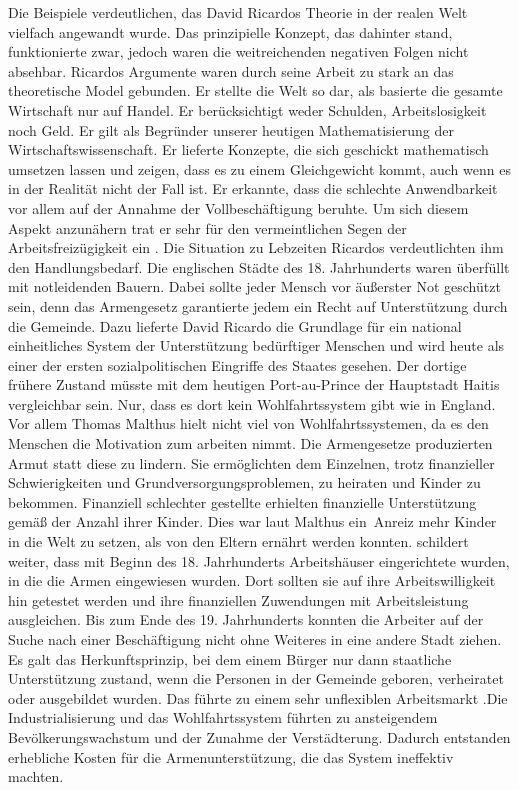 Die Beispiele verdeutlichen, das David Ricardos Theorie in der realen Welt vielfach angewandt wurde. Das prinzipielle Konzept, das dahinter stand, funktionierte zwar, jedoch waren die weitreichenden negativen Folgen nicht absehbar. Ricardos Argumente waren durch seine Arbeit zu stark an das theoretische Model gebunden. Er stellte die Welt so dar, als basierte die gesamte Wirtschaft nur auf Handel. Er ber{\"u}cksichtigt weder Schulden, Arbeitslosigkeit noch Geld. Er gilt als Begr{\"u}nder unserer heutigen Mathematisierung der Wirtschaftswissenschaft. Er lieferte Konzepte, die sich geschickt mathematisch umsetzen lassen und zeigen, dass es zu einem Gleichgewicht kommt, auch wenn es in der Realit{\"a}t nicht der Fall ist. Er erkannte, dass die schlechte Anwendbarkeit vor allem auf der Annahme der Vollbesch{\"a}ftigung beruhte. Um sich diesem Aspekt anzun{\"a}hern trat er sehr f{\"u}r den vermeintlichen Segen der Arbeitsfreiz{\"u}gigkeit ein \citep{Huther.2006}. \newline Die Situation zu Lebzeiten Ricardos verdeutlichten ihm den Handlungsbedarf. Die englischen St{\"a}dte des 18. Jahrhunderts waren {\"u}berf{\"u}llt mit notleidenden Bauern. Dabei sollte jeder Mensch vor {\"a}u{\ss}erster Not gesch{\"u}tzt sein, denn das Armengesetz garantierte jedem ein Recht auf Unterst{\"u}tzung durch die Gemeinde. Dazu lieferte David Ricardo die Grundlage f{\"u}r ein national einheitliches System der Unterst{\"u}tzung bed{\"u}rftiger Menschen und wird heute als einer der ersten sozialpolitischen Eingriffe des Staates gesehen. Der dortige fr{\"u}here Zustand m{\"u}sste mit dem heutigen Port-au-Prince der Hauptstadt Haitis vergleichbar sein. Nur, dass es dort kein Wohlfahrtssystem gibt wie in England. Vor allem Thomas Malthus hielt nicht viel von Wohlfahrtssystemen, da es den Menschen die Motivation zum arbeiten nimmt. Die Armengesetze produzierten Armut statt diese zu lindern. Sie erm{\"o}glichten dem Einzelnen, trotz finanzieller Schwierigkeiten und Grundversorgungsproblemen, zu heiraten und Kinder zu bekommen. Finanziell schlechter gestellte erhielten finanzielle Unterst{\"u}tzung gem{\"a}{\ss} der Anzahl ihrer Kinder. Dies war laut Malthus ein~Anreiz mehr Kinder in die Welt zu setzen, als von den Eltern ern{\"a}hrt werden konnten. \citet{Lin.2007} schildert weiter, dass mit Beginn des 18. Jahrhunderts Arbeitsh{\"a}user eingerichtete wurden,  in die die Armen eingewiesen wurden. Dort sollten sie auf ihre Arbeitswilligkeit hin getestet werden und ihre finanziellen Zuwendungen mit Arbeitsleistung ausgleichen. \newline Bis zum Ende des 19. Jahrhunderts konnten die Arbeiter auf der Suche nach einer Besch{\"a}ftigung nicht ohne Weiteres in eine andere Stadt ziehen. Es galt das Herkunftsprinzip, bei dem einem B{\"u}rger nur dann staatliche Unterst{\"u}tzung zustand, wenn die Personen in der Gemeinde geboren, verheiratet oder ausgebildet wurden. Das f{\"u}hrte zu einem sehr unflexiblen Arbeitsmarkt \citep{Wende.2001}.\newline Die Industrialisierung und das Wohlfahrtssystem f{\"u}hrten zu ansteigendem Bev{\"o}lkerungswachstum und der Zunahme der Verst{\"a}dterung. Dadurch entstanden erhebliche Kosten f{\"u}r die Armenunterst{\"u}tzung, die das System ineffektiv machten. 